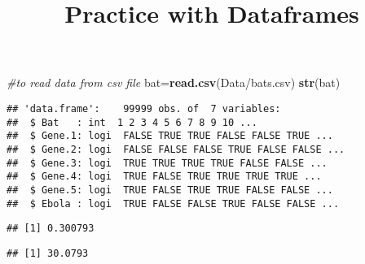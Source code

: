 \documentclass[
]{article}
\title{Practice with Dataframes}
\author{}
\date{\vspace{-2.5em}}
\newenvironment{Shaded}{\begin{snugshade}}{\end{snugshade}}
\newcommand{\CommentTok}[1]{\textcolor[rgb]{0.56,0.35,0.01}{\textit{#1}}}
\newcommand{\DecValTok}[1]{\textcolor[rgb]{0.00,0.00,0.81}{#1}}
\newcommand{\FloatTok}[1]{\textcolor[rgb]{0.00,0.00,0.81}{#1}}
\newcommand{\FunctionTok}[1]{\textcolor[rgb]{0.13,0.29,0.53}{\textbf{#1}}}
\newcommand{\NormalTok}[1]{#1}
\newcommand{\OtherTok}[1]{\textcolor[rgb]{0.56,0.35,0.01}{#1}}
\newcommand{\SpecialCharTok}[1]{\textcolor[rgb]{0.81,0.36,0.00}{\textbf{#1}}}
\newcommand{\StringTok}[1]{\textcolor[rgb]{0.31,0.60,0.02}{#1}}
\begin{document}
\maketitle

\begin{Shaded}
\begin{Highlighting}[]
\CommentTok{\#to read data from csv file}
\NormalTok{bat}\OtherTok{=}\FunctionTok{read.csv}\NormalTok{(}\StringTok{\textquotesingle{}Data/bats.csv\textquotesingle{}}\NormalTok{)}
\FunctionTok{str}\NormalTok{(bat)}
\end{Highlighting}
\end{Shaded}

\begin{verbatim}
## 'data.frame':    99999 obs. of  7 variables:
##  $ Bat   : int  1 2 3 4 5 6 7 8 9 10 ...
##  $ Gene.1: logi  FALSE TRUE TRUE FALSE FALSE TRUE ...
##  $ Gene.2: logi  FALSE FALSE FALSE TRUE FALSE FALSE ...
##  $ Gene.3: logi  TRUE TRUE TRUE TRUE FALSE FALSE ...
##  $ Gene.4: logi  TRUE FALSE TRUE TRUE TRUE TRUE ...
##  $ Gene.5: logi  TRUE FALSE TRUE TRUE FALSE FALSE ...
##  $ Ebola : logi  TRUE FALSE FALSE TRUE FALSE FALSE ...
\end{verbatim}

\begin{Shaded}
\end{Shaded}

\begin{verbatim}
## [1] 0.300793
\end{verbatim}

\begin{Shaded}
\end{Shaded}

\begin{verbatim}
## [1] 30.0793
\end{verbatim}

\begin{Shaded}
\end{Shaded}
\end{document}
